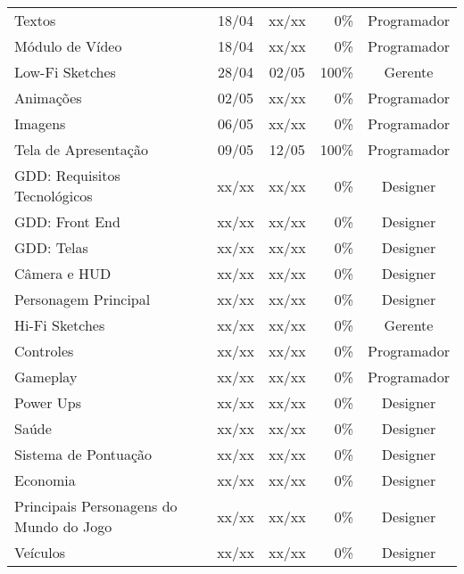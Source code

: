 \documentclass[a4paper, 11pt]{article} %
\begin{document}
\begin{table}[h]
\begin{tabular}{lccrc}
Textos                               & 18/04 & xx/xx & 0\%   & Programador \\ %
\rowcolor[gray]{0.9}
Módulo de Vídeo                      & 18/04 & xx/xx & 0\%   & Programador \\ %
Low-Fi Sketches                      & 28/04 & 02/05 & 100\% & Gerente \\ %
\rowcolor[gray]{0.9}
Animações                            & 02/05 & xx/xx & 0\%   & Programador \\ %
Imagens                              & 06/05 & xx/xx & 0\%   & Programador \\ %
\rowcolor[gray]{0.9}
Tela de Apresentação                 & 09/05 & 12/05 & 100\% & Programador \\ %
GDD: Requisitos Tecnológicos         & xx/xx & xx/xx & 0\%   & Designer \\
\rowcolor[gray]{0.9}
GDD: Front End                       & xx/xx & xx/xx & 0\%   & Designer \\
GDD: Telas                           & xx/xx & xx/xx & 0\%   & Designer \\
\rowcolor[gray]{0.9}
Câmera e HUD                         & xx/xx & xx/xx & 0\%   & Designer \\
Personagem Principal                 & xx/xx & xx/xx & 0\%   & Designer \\
\rowcolor[gray]{0.9}
Hi-Fi Sketches                       & xx/xx & xx/xx & 0\%   & Gerente \\
Controles                            & xx/xx & xx/xx & 0\%   & Programador \\
\rowcolor[gray]{0.9}
Gameplay                             & xx/xx & xx/xx & 0\%   & Programador \\
Power Ups                            & xx/xx & xx/xx & 0\%   & Designer \\
\rowcolor[gray]{0.9}
Saúde                                & xx/xx & xx/xx & 0\%   & Designer \\
Sistema de Pontuação                 & xx/xx & xx/xx & 0\%   & Designer \\
\rowcolor[gray]{0.9}
Economia                             & xx/xx & xx/xx & 0\%   & Designer \\
Principais Personagens do Mundo do Jogo & xx/xx & xx/xx & 0\% & Designer \\
\rowcolor[gray]{0.9}
Veículos                             & xx/xx & xx/xx & 0\%   & Designer \\
\midrule
\end{tabular}
\end{table}
\end{document}
